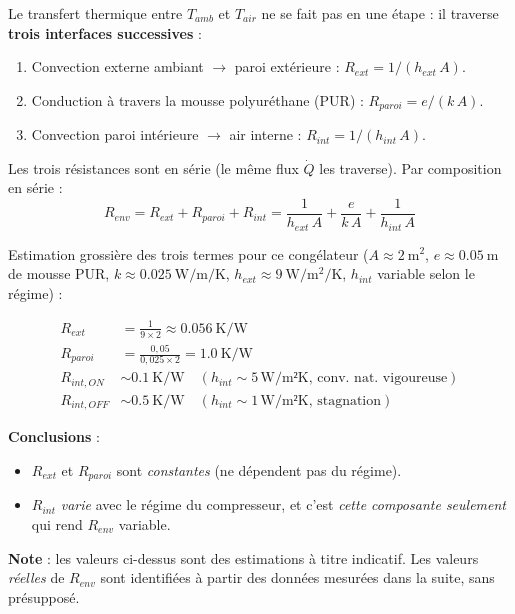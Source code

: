 \documentclass[11pt,a4paper]{article}
\begin{document}
\begin{demo}
Le transfert thermique entre $T_{amb}$ et $T_{air}$ ne se fait pas en une étape : il
traverse \textbf{trois interfaces successives} :

\begin{enumerate}
\item Convection externe ambiant $\to$ paroi extérieure : $R_{ext} = 1/(h_{ext}\,A)$.
\item Conduction à travers la mousse polyuréthane (PUR) : $R_{paroi} = e/(k\,A)$.
\item Convection paroi intérieure $\to$ air interne : $R_{int} = 1/(h_{int}\,A)$.
\end{enumerate}

Les trois résistances sont en série (le même flux $\dot Q$ les traverse). Par composition
en série :
\begin{equation}
\boxed{\;R_{env} = R_{ext} + R_{paroi} + R_{int}
= \frac{1}{h_{ext}\,A} + \frac{e}{k\,A} + \frac{1}{h_{int}\,A}\;}
\end{equation}
\end{demo}

\begin{exemple}
Estimation grossière des trois termes pour ce congélateur ($A \approx \SI{2}{\meter\squared}$,
$e \approx \SI{0,05}{\meter}$ de mousse PUR, $k \approx \SI{0,025}{\watt\per\meter\per\kelvin}$,
$h_{ext} \approx \SI{9}{\watt\per\meter\squared\per\kelvin}$,
$h_{int}$ variable selon le régime) :

\begin{align*}
R_{ext} &= \frac{1}{9 \times 2} \approx \SI{0,056}{\kelvin\per\watt} \\
R_{paroi} &= \frac{0,05}{0,025 \times 2} = \SI{1,0}{\kelvin\per\watt} \\
R_{int,ON} &\sim \SI{0,1}{\kelvin\per\watt}\quad (h_{int} \sim 5\,\text{W/m²K, conv. nat. vigoureuse}) \\
R_{int,OFF} &\sim \SI{0,5}{\kelvin\per\watt}\quad (h_{int} \sim 1\,\text{W/m²K, stagnation})
\end{align*}

\textbf{Conclusions} :
\begin{itemize}[itemsep=0pt]
\item $R_{ext}$ et $R_{paroi}$ sont \emph{constantes} (ne dépendent pas du régime).
\item $R_{int}$ \emph{varie} avec le régime du compresseur, et c'est \emph{cette
composante seulement} qui rend $R_{env}$ variable.
\end{itemize}

\textbf{Note} : les valeurs ci-dessus sont des estimations à titre indicatif. Les valeurs
\emph{réelles} de $R_{env}$ sont identifiées à partir des données mesurées dans la suite,
sans présupposé.

\end{exemple}
\end{document}
